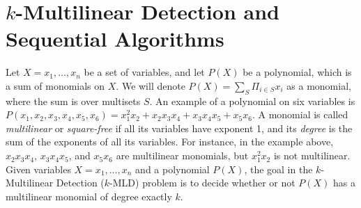 

\section{$k$-Multilinear Detection and Sequential Algorithms}
Let $X = x_1, \ldots,x_n$ be a set of variables, and let $P(X)$ be a polynomial, which is a sum 
of monomials on $X$. We will denote $P(X)=\sum_S \Pi_{i\in S} x_i$ as a monomial, where
the sum is over multisets $S$.  An example of a polynomial on six variables is 
$P(x_1,x_2,x_3,x_4, x_5, x_6) = x_1^2x_2 + x_2x_3x_4 + x_3x_4x_5 + x_5x_6$. 
A monomial is called \emph{multilinear} or \emph{square-free} if all its variables 
have exponent 1, and its \emph{degree} is the sum of the exponents of all its variables. 
For instance, in the example above, $x_2x_3x_4$, $x_3x_4x_5$, and $x_5x_6$ are multilinear monomials, but $x_1^2x_2$ is not multilinear. 
Given variables $X = x_1, \ldots ,x_n$ and a polynomial $P(X)$, the goal in 
the $k$-Multilinear Detection (\textsc{$k$-MLD}) problem
is to decide whether or not $P(X)$ has a multilinear monomial of degree exactly $k$. 

